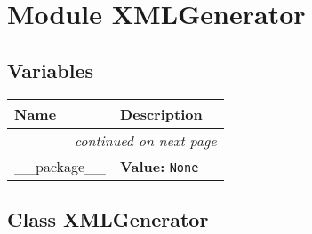 %
%
%


\section{Module XMLGenerator}

    \label{XMLGenerator}


  \subsection{Variables}

    \vspace{-1cm}
\hspace{\varindent}\begin{longtable}{|p{\varnamewidth}|p{\vardescrwidth}|l}
\cline{1-2}
\cline{1-2} \centering \textbf{Name} & \centering \textbf{Description}& \\
\cline{1-2}
\endhead\cline{1-2}\multicolumn{3}{r}{\small\textit{continued on next page}}\\\endfoot\cline{1-2}
\endlastfoot\raggedright \_\-\_\-p\-a\-c\-k\-a\-g\-e\-\_\-\_\- & \raggedright \textbf{Value:} 
{\tt None}&\\
\cline{1-2}
\end{longtable}



\subsection{Class XMLGenerator}

